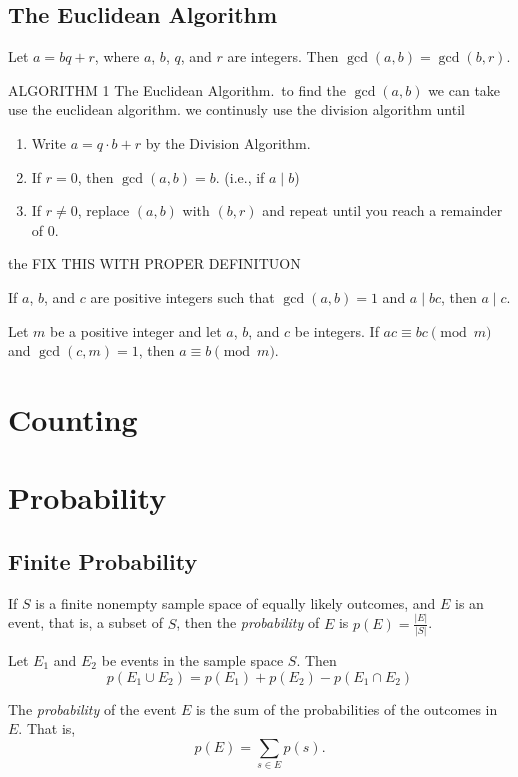 \documentclass{article}
\begin{document}
\subsection{The Euclidean Algorithm}
\begin{theorem}
    Let \( a = bq + r \), where \(a \), \(b \), \(q \), and \(r \) are integers. Then \( \gcd(a, b) = \gcd(b, r)\).
\end{theorem}
\begin{theorem}
    ALGORITHM 1 The Euclidean Algorithm.\
    to find the \( \gcd(a, b)\) we can take use the euclidean algorithm. we continusly use the division algorithm until
    \begin{enumerate}
        \item Write \( a = q \cdot b + r \) by the Division Algorithm.
        \item If \( r = 0 \), then \( \gcd(a,b) = b \). (i.e., if \( a \mid b \))
        \item If \( r \neq 0 \), replace \( (a,b) \) with \( (b,r) \) and repeat until you reach a remainder of 0.
    \end{enumerate}    
    the FIX THIS WITH PROPER DEFINITUON
\end{theorem}
\begin{theorem}
    If \(a \), \(b \), and \(c \) are positive integers such that \( \gcd(a,b) = 1\) and \(a \mid bc\), then \(a \mid c \).
\end{theorem}
\begin{theorem}
    Let \( m \) be a positive integer and let \( a \), \( b \), and \( c \) be integers. If \( ac \equiv bc \pmod{m} \) and \( \gcd(c,m) = 1 \), then \( a \equiv b \pmod{m}. \)
\end{theorem}

\section{Counting}


\section{Probability}
\subsection{Finite Probability}
\begin{theorem}
    If \( S \) is a finite nonempty sample space of equally likely outcomes, and \( E \) is an event, that is, a subset of \( S \), then the \textit{probability} of \( E \) is \( p(E) = \frac{|E|}{|S|} \).
\end{theorem}
\begin{theorem}
    Let \(E_1 \) and \(E_2\) be events in the sample space \(S \). Then \
    \[
    p(E_1 \cup E_2) = p(E_1) + p(E_2) - p(E_1 \cap E_2)
    \]
\end{theorem}
\begin{definition}
    The \textit{probability} of the event \( E \) is the sum of the probabilities of the outcomes in \( E \). That is,
    \[p(E) = \sum_{s \in E} p(s).\]
\end{definition}
\end{document}
